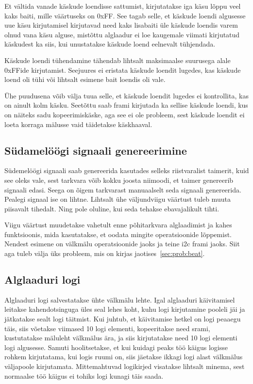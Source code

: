 \documentclass[12pt,a4paper]{article}
\begin{document}
Et vältida vanade käskude loendisse sattumist, kirjutatakse iga käsu lõppu veel
kaks baiti, mille väärtuseks on 0xFF. See tagab selle, et käskude loendi
algusesse uue käsu kirjutamisel kirjutavad need kaks lisabaiti üle käskude
loendis varem olnud vana käsu alguse, mistõttu alglaadur ei loe kaugemale
viimati kirjutatud käskudest ka siis, kui unustatakse käskude loend eelnevalt
tühjendada.

Käskude loendi tühendamine tähendab lihtsalt maksimaalse suurusega alale
0xFFide kirjutamist. Seejuures ei eristata käskude loendit lugedes, kas
käskude loend oli tühi või lihtsalt esimene bait loendis oli vale.

Ühe puudusena võib välja tuua selle, et käskude loendit lugedes ei kontrollita,
kas on ainult kolm käsku. Seetõttu saab \gls{fram}i kirjutada ka sellise käskude
loendi, kus on näiteks sadu kopeerimiskäske, aga see ei ole probleem, sest
käskude loendit ei loeta korraga mälusse vaid täidetakse käskhaaval.


\subsection{Südamelöögi signaali genereerimine}
Südemelöögi signaali saab genereerida kasutades selleks riistvaralist taimerit,
kuid see oleks vale, sest tarkvara võib kokku joosta niimoodi, et taimer
genereerib signaali edasi. Seega on õigem tarkvarast manuaalselt seda signaali
genereerida.  Pealegi signaal ise on lihtne. Lihtsalt ühe väljundviigu väärtust
tuleb muuta piisavalt tihedalt. Ning pole oluline, kui seda tehakse
ebavajalikult tihti.

Viigu väärtust muudetakse vahetult enne põhitarkvara alglaadimist ja kahes
funktsioonis, mida kasutatakse, et oodata mingite operatsioonide lõppe\-mist.
Nendest esimene on välkmälu operatsioonide jaoks ja teine \gls{i2c} \gls{fram}i jaoks. Siit
aga tuleb välja üks probleem, mis on kirjas jaotises~\ref{sec:prob:beat}. 

\subsection{Alglaaduri logi}
\label{sec:impl:log}
Alglaaduri logi salvestatakse ühte välkmälu lehte. Igal alglaaduri käivitamisel
leitakse kahendotsinguga üles seal lehes koht, kuhu logi kirjutamine pooleli jäi
ja jätkatakse sealt logi täitmist. Kui juhtub, et käivitamise hetkel on logi
peaaegu täis, siis võetakse viimased 10 logi elementi, kopeeritakse need
\gls{sram}i, kustutatakse mäluleht välkmälus ära, ja siis kirjutatakse need 10
logi elementi logi algusesse. Samuti hoolitsetakse, et kui kuidagi peaks töö
käigus logisse rohkem kirjutatama, kui logis ruumi on, siis jäetakse ikkagi logi
alast välkmälus väljapoole kirjutamata. Mittemahtuvad logikirjed visatakse
lihtsalt minema, sest normaalse töö käigus ei tohiks logi kunagi täis saada.
\end{document}
